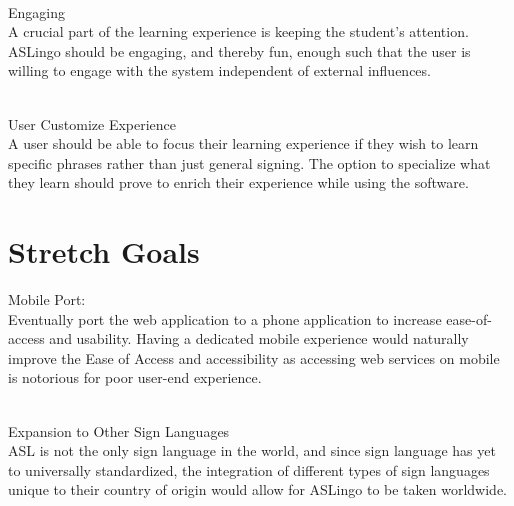 \documentclass{article}
\begin{document}
~\\Engaging\\
A crucial part of the learning experience is keeping the student's attention. ASLingo should be engaging, and thereby fun, enough such that the user is willing to engage with the system independent of external influences.

~\\User Customize Experience\\
A user should be able to focus their learning experience if they wish to learn specific phrases rather than just general signing. The option to specialize what they learn should prove to enrich their experience while using the software.

\section{Stretch Goals}

Mobile Port:\\
Eventually port the web application to a phone application to increase ease-of-access and usability. Having a dedicated mobile experience would naturally improve the Ease of Access and accessibility as accessing web services on mobile is notorious for poor user-end experience.

~\\Expansion to Other Sign Languages\\
ASL is not the only sign language in the world, and since sign language has yet to universally standardized, the integration of different types of sign languages unique to their country of origin would allow for ASLingo to be taken worldwide.
\end{document}

